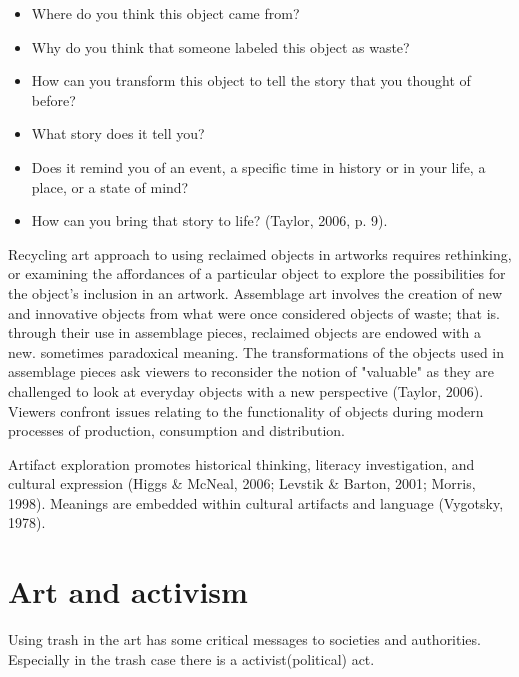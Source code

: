 
\begin{itemize}
\item Where do you think this object came from?
\item Why do you think that someone labeled this object as waste?
\item How can you transform this object to tell the story that you thought of before?
\item What story does it tell you?
\item Does it remind you of an event, a specific time in history or in your life, a place, or a state of mind?
\item How can you bring that story to life? (Taylor, 2006, p. 9).
\end{itemize}

Recycling art approach to using reclaimed objects in artworks requires rethinking, or examining the affordances of a particular object to explore the possibilities for the object's inclusion in an artwork. Assemblage art involves the creation of new and innovative objects from what were once considered objects of waste; that is. through their use in assemblage pieces, reclaimed objects are endowed with a new. sometimes paradoxical meaning. The transformations of the objects used in assemblage pieces ask viewers to reconsider the notion of "valuable" as they are challenged to look at everyday objects with a new perspective (Taylor, 2006). Viewers confront issues relating to the functionality of objects during modern processes of production, consumption and distribution.

Artifact exploration promotes historical thinking, literacy investigation, and cultural expression (Higgs \& McNeal, 2006; Levstik \& Barton, 2001; Morris, 1998). Meanings are embedded within cultural artifacts and language (Vygotsky, 1978).

\section{Art and activism}
Using trash in the art has some critical messages to societies and authorities. Especially in the trash case there is a activist(political) act. 

